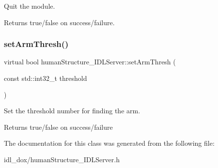 Quit the module. 

\begin{DoxyReturn}{Returns}
true/false on success/failure. 
\end{DoxyReturn}
\mbox{\label{classhumanStructure__IDLServer_aaae9e95ab2098cd58c97eadeb21f509d}} 
\subsubsection{\texorpdfstring{set\+Arm\+Thresh()}{setArmThresh()}}
{\footnotesize\ttfamily virtual bool human\+Structure\+\_\+\+I\+D\+L\+Server\+::set\+Arm\+Thresh (\begin{DoxyParamCaption}\item[{const std\+::int32\+\_\+t}]{threshold }\end{DoxyParamCaption})\hspace{0.3cm}{\ttfamily [virtual]}}



Set the threshold number for finding the arm. 

\begin{DoxyReturn}{Returns}
true/false on success/failure 
\end{DoxyReturn}


The documentation for this class was generated from the following file\+:\begin{DoxyCompactItemize}
\item 
idl\+\_\+dox/human\+Structure\+\_\+\+I\+D\+L\+Server.\+h\end{DoxyCompactItemize}
